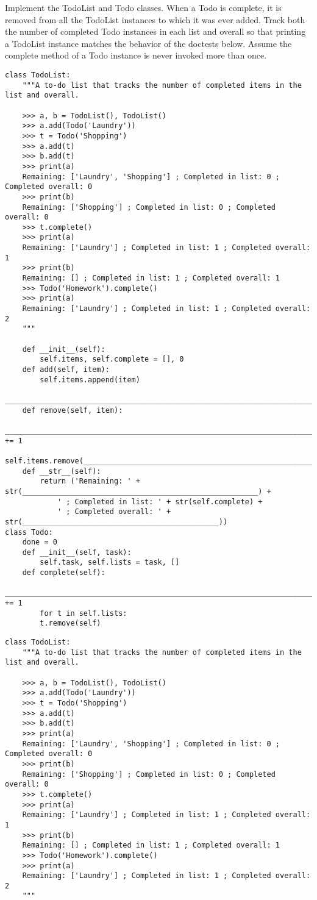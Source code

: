 \documentclass{exam}
\begin{document}
\begin{questions}
\begin{blocksection}
	Implement the TodoList and Todo classes. When a Todo is complete, it is removed from all the TodoList instances to which it was ever added. Track both the number of completed Todo instances in each list and overall so that printing a TodoList instance matches the behavior of the doctests below. Assume the complete method of a Todo instance is never invoked more than once.
\begin{lstlisting}
class TodoList:
	"""A to-do list that tracks the number of completed items in the list and overall.

	>>> a, b = TodoList(), TodoList()
	>>> a.add(Todo('Laundry'))
	>>> t = Todo('Shopping')
	>>> a.add(t)
	>>> b.add(t)
	>>> print(a)
	Remaining: ['Laundry', 'Shopping'] ; Completed in list: 0 ; Completed overall: 0
	>>> print(b)
	Remaining: ['Shopping'] ; Completed in list: 0 ; Completed overall: 0
	>>> t.complete()
	>>> print(a)
	Remaining: ['Laundry'] ; Completed in list: 1 ; Completed overall: 1
	>>> print(b)
	Remaining: [] ; Completed in list: 1 ; Completed overall: 1
	>>> Todo('Homework').complete()
	>>> print(a)
	Remaining: ['Laundry'] ; Completed in list: 1 ; Completed overall: 2
	"""
	
	def __init__(self):
		self.items, self.complete = [], 0
	def add(self, item):
		self.items.append(item)
		_____________________________________________________________________________________
	def remove(self, item):
		________________________________________________________________________________ += 1
		self.items.remove(___________________________________________________________________)
	def __str__(self):
		return ('Remaining: ' + str(______________________________________________________) + 
			' ; Completed in list: ' + str(self.complete) +
			' ; Completed overall: ' + str(_____________________________________________))
class Todo:
	done = 0
	def __init__(self, task):
		self.task, self.lists = task, []
	def complete(self):
		________________________________________________________________________________ += 1
		for t in self.lists:
		t.remove(self)
	\end{lstlisting}
\end{blocksection}
\begin{solution}
	\begin{lstlisting}
class TodoList:
	"""A to-do list that tracks the number of completed items in the list and overall.

	>>> a, b = TodoList(), TodoList()
	>>> a.add(Todo('Laundry'))
	>>> t = Todo('Shopping')
	>>> a.add(t)
	>>> b.add(t)
	>>> print(a)
	Remaining: ['Laundry', 'Shopping'] ; Completed in list: 0 ; Completed overall: 0
	>>> print(b)
	Remaining: ['Shopping'] ; Completed in list: 0 ; Completed overall: 0
	>>> t.complete()
	>>> print(a)
	Remaining: ['Laundry'] ; Completed in list: 1 ; Completed overall: 1
	>>> print(b)
	Remaining: [] ; Completed in list: 1 ; Completed overall: 1
	>>> Todo('Homework').complete()
	>>> print(a)
	Remaining: ['Laundry'] ; Completed in list: 1 ; Completed overall: 2
	"""
		

\end{lstlisting}
\end{solution}
\end{questions}
\end{document}
